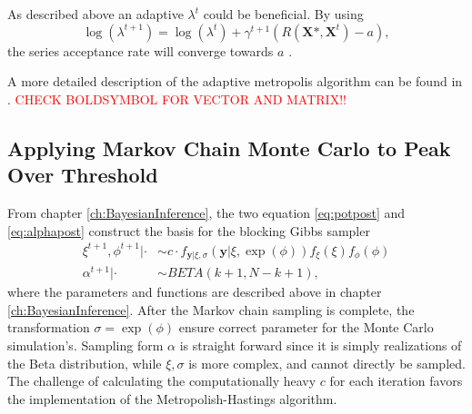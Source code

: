 As described above an adaptive $\lambda^t$ could be beneficial. By using
\begin{equation}
\log(\lambda^{t+1})=\log( \lambda^{t} ) + \gamma^{t+1} \left( R(\boldsymbol{X} \mbox{*},\boldsymbol{X}^{t}) -a \right),
\end{equation}
the series acceptance rate will converge towards $a$ \cite[p.~248]{compstat}.

A more detailed description of the adaptive metropolis algorithm can be found in \cite[p.~247]{compstat}.
\textcolor{red}{CHECK BOLDSYMBOL FOR VECTOR AND MATRIX!!}
\subsection{Applying Markov Chain Monte Carlo to Peak Over Threshold}
From chapter \ref{ch:BayesianInference}, the two equation \eqref{eq:potpost} and \eqref{eq:alphapost} construct the basis for the blocking Gibbs sampler
\begin{align*}
\xi^{t+1},\phi^{t+1}|\cdot & \sim c \cdot f_{\boldsymbol{y}|\xi,\sigma}\left(\boldsymbol{y}|\xi,\exp(\phi)\right)f_{\xi}(\xi)f_{\phi}(\phi)\\
\alpha^{t+1}|\cdot & \sim BETA(k+1, N-k+1),
\end{align*}
where the parameters and functions are described above in chapter \ref{ch:BayesianInference}. After the Markov chain sampling is complete, the transformation $\sigma=\exp(\phi)$ ensure correct parameter for the Monte Carlo simulation's. Sampling form $\alpha$ is straight forward since it is simply realizations of the Beta distribution, while $\xi, \sigma$ is more complex, and cannot directly be sampled. The challenge of calculating the computationally heavy $c$ for each iteration favors the implementation of the Metropolish-Hastings algorithm.

